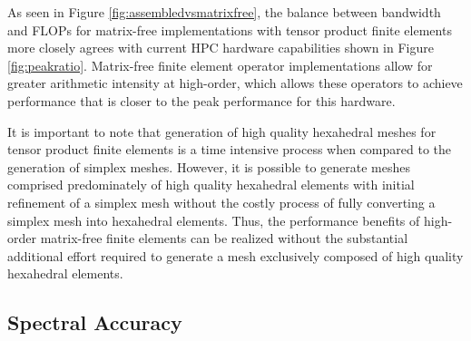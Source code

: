 As seen in Figure \ref{fig:assembledvsmatrixfree}, the balance between bandwidth and FLOPs for matrix-free implementations with tensor product finite elements more closely agrees with current HPC hardware capabilities shown in Figure \ref{fig:peakratio}.
Matrix-free finite element operator implementations allow for greater arithmetic intensity at high-order, which allows these operators to achieve performance that is closer to the peak performance for this hardware.

It is important to note that generation of high quality hexahedral meshes for tensor product finite elements is a time intensive process when compared to the generation of simplex meshes.
However, it is possible to generate meshes comprised predominately of high quality hexahedral elements with initial refinement of a simplex mesh without the costly process of fully converting a simplex mesh into hexahedral elements.
Thus, the performance benefits of high-order matrix-free finite elements can be realized without the substantial additional effort required to generate a mesh exclusively composed of high quality hexahedral elements.

\subsection{Spectral Accuracy}
